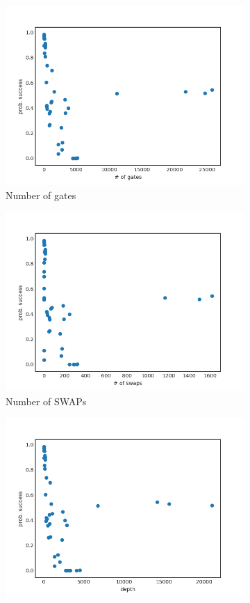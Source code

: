 \documentclass[11pt]{article}
\begin{document}
\begin{figure}[H] 
  \begin{subfigure}[b]{0.5\linewidth}
    \centering
    \includegraphics[width=0.75\linewidth]{ps_g_1000} 
    \caption{Number of gates} 
    \label{fig:ps_g_1000} 
    \vspace{4ex}
  \end{subfigure}%
  \begin{subfigure}[b]{0.5\linewidth}
    \centering
    \includegraphics[width=0.75\linewidth]{ps_s_1000} 
    \caption{Number of SWAPs} 
    \label{fig:ps_s_1000} 
    \vspace{4ex}
  \end{subfigure} 
  \begin{subfigure}[b]{0.5\linewidth}
    \centering
    \includegraphics[width=0.75\linewidth]{ps_d_1000} 

\end{subfigure}
\end{figure}
\end{document}

